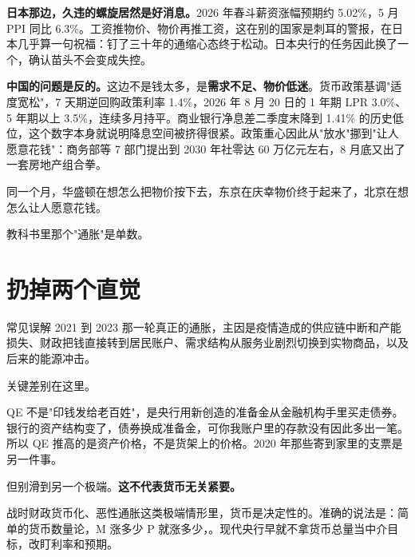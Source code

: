 \textbf{日本那边，久违的螺旋居然是好消息。}2026 年春斗薪资涨幅预期约 5.02\%，5 月 PPI 同比 6.3\%。工资推物价、物价再推工资，这在别的国家是刺耳的警报，在日本几乎算一句祝福：钉了三十年的通缩心态终于松动。日本央行的任务因此换了一个，确认苗头不会变成失控。

\textbf{中国的问题是反的。}这边不是钱太多，是\textbf{需求不足、物价低迷}。货币政策基调"适度宽松"，7 天期逆回购政策利率 1.4\%，2026 年 8 月 20 日的 1 年期 LPR 3.0\%、5 年期以上 3.5\%，连续多月持平。商业银行净息差二季度末降到 1.41\% 的历史低位，这个数字本身就说明降息空间被挤得很紧。政策重心因此从"放水"挪到"让人愿意花钱"：商务部等 7 部门提出到 2030 年社零达 60 万亿元左右，8 月底又出了一套房地产组合拳。

同一个月，华盛顿在想怎么把物价按下去，东京在庆幸物价终于起来了，北京在想怎么让人愿意花钱。

教科书里那个"通胀"是单数。

\section{扔掉两个直觉}

\begin{mythbox}{常见误解}
2021 到 2023 那一轮真正的通胀，主因是疫情造成的供应链中断和产能损失、财政把钱直接转到居民账户、需求结构从服务业剧烈切换到实物商品，以及后来的能源冲击。

关键差别在这里。

QE 不是"印钱发给老百姓"，是央行用新创造的准备金从金融机构手里买走债券。银行的资产结构变了，债券换成准备金，可你我账户里的存款没有因此多出一笔。所以 QE 推高的是资产价格，不是货架上的价格。2020 年那些寄到家里的支票是另一件事。

但别滑到另一个极端。\textbf{这不代表货币无关紧要。}

战时财政货币化、恶性通胀这类极端情形里，货币是决定性的。准确的说法是：简单的货币数量论，M 涨多少 P 就涨多少，。现代央行早就不拿货币总量当中介目标，改盯利率和预期。

\end{mythbox}

